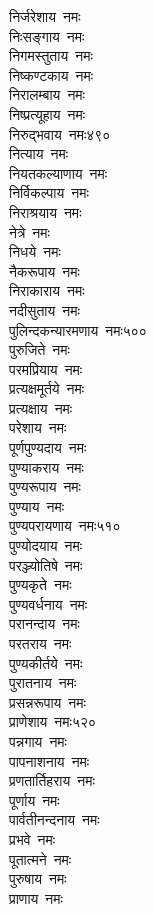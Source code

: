 \begin{multicols}{\maxColumns}
\begin{flushleft}
निर्जरेशाय~नमः\\
निःसङ्गाय~नमः\\
निगमस्तुताय~नमः\\
निष्कण्टकाय~नमः\\
निरालम्बाय~नमः\\
निष्प्रत्यूहाय~नमः\\
निरुद्भवाय~नमः\hfill ४९०\\
नित्याय~नमः\\
नियतकल्याणाय~नमः\\
निर्विकल्पाय~नमः\\
निराश्रयाय~नमः\\
नेत्रे~नमः\\
निधये~नमः\\
नैकरूपाय~नमः\\
निराकाराय~नमः\\
नदीसुताय~नमः\\
पुलिन्दकन्यारमणाय~नमः\hfill ५००\\
पुरुजिते~नमः\\
परमप्रियाय~नमः\\
प्रत्यक्षमूर्तये~नमः\\
प्रत्यक्षाय~नमः\\
परेशाय~नमः\\
पूर्णपुण्यदाय~नमः\\
पुण्याकराय~नमः\\
पुण्यरूपाय~नमः\\
पुण्याय~नमः\\
पुण्यपरायणाय~नमः\hfill ५१०\\
पुण्योदयाय~नमः\\
परञ्ज्योतिषे~नमः\\
पुण्यकृते~नमः\\
पुण्यवर्धनाय~नमः\\
परानन्दाय~नमः\\
परतराय~नमः\\
पुण्यकीर्तये~नमः\\
पुरातनाय~नमः\\
प्रसन्नरूपाय~नमः\\
प्राणेशाय~नमः\hfill ५२०\\
पन्नगाय~नमः\\
पापनाशनाय~नमः\\
प्रणतार्तिहराय~नमः\\
पूर्णाय~नमः\\
पार्वतीनन्दनाय~नमः\\
प्रभवे~नमः\\
पूतात्मने~नमः\\
पुरुषाय~नमः\\
प्राणाय~नमः\\

\end{flushleft}
\end{multicols}
